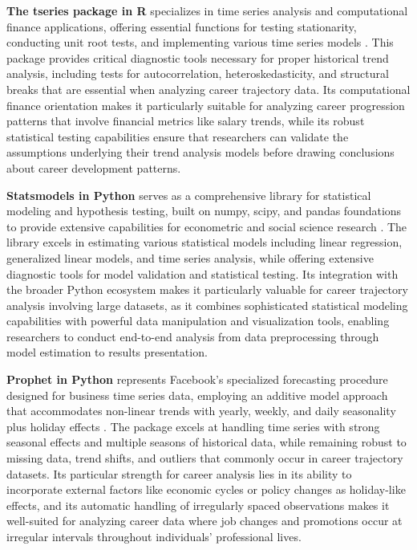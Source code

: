 \documentclass[../main.tex]{subfiles}
\begin{document}
\textbf{The tseries package in R} specializes in time series analysis and computational finance applications, offering essential functions for testing stationarity, conducting unit root tests, and implementing various time series models \citep{cran2023}. This package provides critical diagnostic tools necessary for proper historical trend analysis, including tests for autocorrelation, heteroskedasticity, and structural breaks that are essential when analyzing career trajectory data. Its computational finance orientation makes it particularly suitable for analyzing career progression patterns that involve financial metrics like salary trends, while its robust statistical testing capabilities ensure that researchers can validate the assumptions underlying their trend analysis models before drawing conclusions about career development patterns.

\textbf{Statsmodels in Python} serves as a comprehensive library for statistical modeling and hypothesis testing, built on numpy, scipy, and pandas foundations to provide extensive capabilities for econometric and social science research \citep{codecademy2023}. The library excels in estimating various statistical models including linear regression, generalized linear models, and time series analysis, while offering extensive diagnostic tools for model validation and statistical testing. Its integration with the broader Python ecosystem makes it particularly valuable for career trajectory analysis involving large datasets, as it combines sophisticated statistical modeling capabilities with powerful data manipulation and visualization tools, enabling researchers to conduct end-to-end analysis from data preprocessing through model estimation to results presentation.

\textbf{Prophet in Python} represents Facebook's specialized forecasting procedure designed for business time series data, employing an additive model approach that accommodates non-linear trends with yearly, weekly, and daily seasonality plus holiday effects \citep{pypi2023}. The package excels at handling time series with strong seasonal effects and multiple seasons of historical data, while remaining robust to missing data, trend shifts, and outliers that commonly occur in career trajectory datasets. Its particular strength for career analysis lies in its ability to incorporate external factors like economic cycles or policy changes as holiday-like effects, and its automatic handling of irregularly spaced observations makes it well-suited for analyzing career data where job changes and promotions occur at irregular intervals throughout individuals' professional lives.
\end{document}
